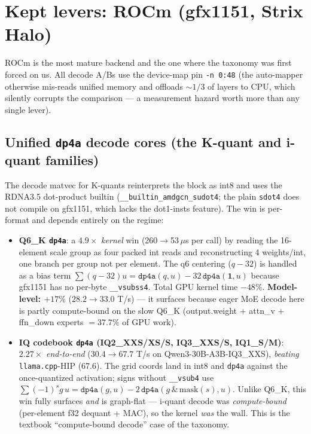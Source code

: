 \documentclass[11pt]{article}
\newcommand{\x}{\ensuremath{\times}}
\newcommand{\dpa}{\texttt{dp4a}}
\begin{document}
\section{Kept levers: ROCm (gfx1151, Strix Halo)}
\label{sec:rocm}
ROCm is the most mature backend and the one where the taxonomy was first forced on us. All decode
A/Bs use the device-map pin \texttt{-n 0:48} (the auto-mapper otherwise mis-reads unified memory
and offloads $\sim 1/3$ of layers to CPU, which silently corrupts the comparison --- a measurement
hazard worth more than any single lever).

\subsection{Unified \dpa{} decode cores (the K-quant and i-quant families)}
The decode matvec for K-quants reinterprets the block as int8 and uses the RDNA3.5 dot-product
builtin (\texttt{\_\_builtin\_amdgcn\_sudot4}; the plain \texttt{sdot4} does not compile on gfx1151,
which lacks the dot1-insts feature). The win is per-format and depends entirely on the regime:

\begin{itemize}[noitemsep]
  \item \textbf{Q6\_K \dpa{}}: a $4.9\x$ \emph{kernel} win (260$\to$53\,$\mu$s per call) by reading
        the 16-element scale group as four packed int reads and reconstructing 4 weights/int, one
        branch per group not per element. The q6 centering ($q-32$) is handled as a bias term
        $\sum(q-32)u = \dpa(q,u) - 32\,\dpa(\mathbf{1},u)$ because gfx1151 has no per-byte
        \texttt{\_\_vsubss4}. Total GPU kernel time $-48\%$. \textbf{Model-level: $+17\%$}
        ($28.2\to33.0$ T/s) --- it surfaces because eager MoE decode here is partly compute-bound
        on the slow Q6\_K (output.weight + attn\_v + ffn\_down experts $=37.7\%$ of GPU work).
  \item \textbf{IQ codebook \dpa{} (IQ2\_XXS/XS/S, IQ3\_XXS/S, IQ1\_S/M)}: $2.27\x$ \emph{end-to-end}
        ($30.4\to 67.7$ T/s on Qwen3-30B-A3B-IQ3\_XXS), \emph{beating} \texttt{llama.cpp}-HIP
        (67.6). The grid coords land in int8 and \dpa{} against the once-quantized activation; signs
        without \texttt{\_\_vsub4} use $\sum(-1)^s g\,u = \dpa(g,u) - 2\,\dpa(g\,\&\,\text{mask}(s),u)$.
        Unlike Q6\_K, this win fully surfaces \emph{and} is graph-flat --- i-quant decode was
        \emph{compute-bound} (per-element f32 dequant + MAC), so the kernel \emph{was} the wall.
        This is the textbook ``compute-bound decode'' case of the taxonomy.
\end{itemize}
\end{document}
